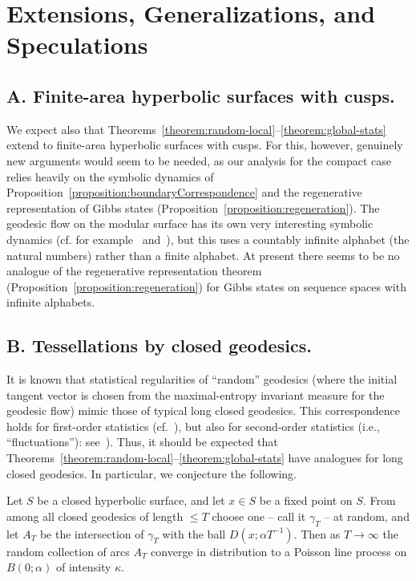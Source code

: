 \documentclass[AHL, Unicode, longabstracts, published]{cedram}
\begin{document}
\section{Extensions, Generalizations, and Speculations}\label{sec:ext}



\subsection*{A. Finite-area hyperbolic surfaces with cusps.}
We expect also that Theorems~\ref{theorem:random-local}--\ref{theorem:global-stats} extend to finite-area hyperbolic surfaces with cusps. For this, however, genuinely new arguments would seem to be needed, as our analysis for the compact case relies heavily on the symbolic dynamics of Proposition~\ref{proposition:boundaryCorrespondence} and the regenerative representation of Gibbs states (Proposition~\ref{proposition:regeneration}). The geodesic flow on the modular surface has its own very interesting symbolic dynamics (cf. for example~\cite{series:modular} and~\cite{adler-flatto:cross-section-map}), but this uses a countably infinite alphabet (the natural numbers) rather than a finite alphabet. At present there seems to be no analogue of the regenerative representation theorem (Proposition~\ref{proposition:regeneration}) for Gibbs states on sequence spaces with infinite alphabets.
%
\subsection*{B. Tessellations by closed geodesics.}
It is known that statistical regularities of ``random'' geodesics (where the initial tangent vector is chosen from the maximal-entropy invariant measure for the geodesic flow) mimic those of typical long closed geodesics. This correspondence holds for first-order statistics (cf.~\cite{bowen:equidistribution}), but also for second-order statistics (i.e., ``fluctuations''): see~\cite{lalley:duke,lalley:axiomA,lalley:homology}). Thus, it should be expected that Theorems~\ref{theorem:random-local}--\ref{theorem:global-stats} have analogues for long closed geodesics. In particular, we conjecture the following.

\begin{conj}\label{conj:closed}
Let $S$ be a closed hyperbolic surface, and let $x\in S$ be a fixed point on $S$. From among all closed geodesics of length $\leq T$ choose one -- call it $\gamma_{T}$ -- at random, and let $A_{T}$ be the intersection of $\gamma_{T}$ with the ball $D (x;\alpha T^{-1})$. Then as $T \rightarrow \infty$ the random collection of arcs $A_{T}$ converge in distribution to a Poisson line process on $B (0;\alpha)$ of intensity $\kappa$.
\end{conj}
\end{document}
